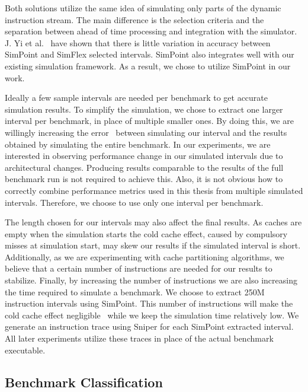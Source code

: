 Both solutions utilize the same idea of simulating only parts of the dynamic instruction stream.
The main difference is the selection criteria and the separation between ahead of time processing and integration with the simulator.
J. Yi et al.~\cite{Yi2005} have shown that there is little variation in accuracy between SimPoint and SimFlex selected intervals.
SimPoint also integrates well with our existing simulation framework.
As a result, we chose to utilize SimPoint in our work.

Ideally a few sample intervals are needed per benchmark to get accurate simulation results.
To simplify the simulation, we chose to extract one larger interval per benchmark, in place of multiple smaller ones.
By doing this, we are willingly increasing the error~\cite{Hamerly2004} between simulating our interval and the results obtained by simulating the entire benchmark.
In our experiments, we are interested in observing performance change in our simulated intervals due to architectural changes.
Producing results comparable to the results of the full benchmark run is not required to achieve this.
Also, it is not obvious how to correctly combine performance metrics used in this thesis from multiple simulated intervals.
Therefore, we choose to use only one interval per benchmark.

The length chosen for our intervals may also affect the final results.
As caches are empty when the simulation starts the cold cache effect, caused by compulsory misses at simulation start, may skew our results if the simulated interval is short.
Additionally, as we are experimenting with cache partitioning algorithms, we believe that a certain number of instructions are needed for our results to stabilize.
Finally, by increasing the number of instructions we are also increasing the time required to simulate a benchmark.
We choose to extract 250M instruction intervals using SimPoint.
This number of instructions will make the cold cache effect negligible~\cite{Hamerly2005,Hamerly2004,Olsen2014} while we keep the simulation time relatively low.
We generate an instruction trace using Sniper for each SimPoint extracted interval.
All later experiments utilize these traces in place of the actual benchmark executable.

\subsection{Benchmark Classification}
\label{sec:methodology:benchmarks:classification}



